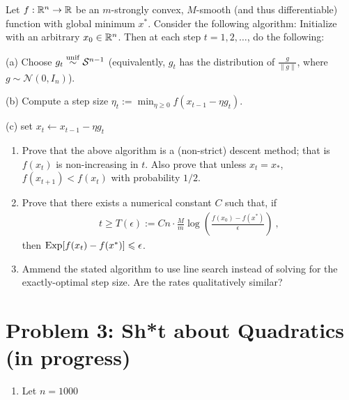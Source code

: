 \documentclass[12pt]{article}
\begin{document}
	Let $f: \mathbb{R}^n \to \mathbb{R}$ be an $m$-strongly convex, $M$-smooth (and thus differentiable) function with global minimum $x^*$. 
%
	Consider the following algorithm: Initialize with an arbitrary $x_0 \in \mathbb{R}^n$. 
%
	Then at each step $t = 1,2,\dots$, do the following: 

	(a) Choose $g_t \overset{\mathrm{unif}}{\sim} {\cal S}^{n-1}$ (equivalently, $g_t$ has the distribution of $\frac{g}{\|g\|}$, where $g\sim \mathcal{N}(0,I_n)$). 

	(b) Compute a step size $\eta_t := \min_{\eta \ge 0} f(x_{t-1}-\eta g_t)$.

	(c) set $x_t \leftarrow x_{t-1}-\eta g_t$

\begin{enumerate}
	\item Prove that the above algorithm is a (non-strict) descent method; that is $f(x_t)$ is non-increasing in $t$. Also prove that unless $x_t = x_*$, $f(x_{t+1}) < f(x_t)$ with probability $1/2$. 
	\item Prove that there exists a numerical constant $C$ such that, if 
	\begin{eqnarray}
	t \ge T(\epsilon) := C n \cdot \frac{M}{m} \log (\frac{f(x_0) - f(x^*)}{\epsilon})~,
	\end{eqnarray}
	then $\mathrm{Exp}[f(x_t) - f(x^*)] \leqslant \epsilon$. 
	\item Ammend the stated algorithm to use line search instead of solving for the exactly-optimal step size. Are the rates qualitatively similar?
\end{enumerate}
\section*{Problem 3: Sh*t about Quadratics (in progress)}
	\begin{enumerate}
		\item Let $n = 1000$

	\end{enumerate}
\end{document}
